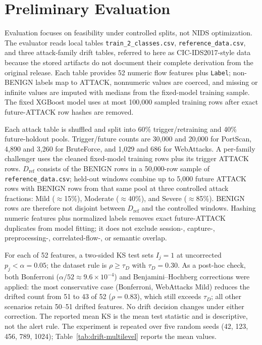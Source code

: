 \documentclass[runningheads]{llncs}
\begin{document}
\FloatBarrier
\section{Preliminary Evaluation}

Evaluation focuses on feasibility under controlled splits, not NIDS optimization. The evaluator reads local tables \texttt{train\_2\_classes.csv}, \texttt{reference\_data.csv}, and three attack-family drift tables, referred to here as CIC-IDS2017-style data because the stored artifacts do not document their complete derivation from the original release. Each table provides 52 numeric flow features plus \texttt{Label}; non-BENIGN labels map to ATTACK, nonnumeric values are coerced, and missing or infinite values are imputed with medians from the fixed-model training sample. The fixed XGBoost model uses at most 100,000 sampled training rows after exact future-ATTACK row hashes are removed.

Each attack table is shuffled and split into 60\% trigger/retraining and 40\% future-holdout pools. Trigger/future counts are 30,000 and 20,000 for PortScan, 4,890 and 3,260 for BruteForce, and 1,029 and 686 for WebAttacks. A per-family challenger uses the cleaned fixed-model training rows plus its trigger ATTACK rows. $D_{\mathrm{ref}}$ consists of the BENIGN rows in a 50,000-row sample of \texttt{reference\_data.csv}; held-out windows combine up to 5,000 future ATTACK rows with BENIGN rows from that same pool at three controlled attack fractions: Mild ($\approx$15\%), Moderate ($\approx$40\%), and Severe ($\approx$85\%). BENIGN rows are therefore not disjoint between $D_{\mathrm{ref}}$ and the controlled windows. Hashing numeric features plus normalized labels removes exact future-ATTACK duplicates from model fitting; it does not exclude session-, capture-, preprocessing-, correlated-flow-, or semantic overlap.

For each of 52 features, a two-sided KS test sets $I_j=1$ at uncorrected $p_j<\alpha=0.05$; the dataset rule is $\rho\geq\tau_D$ with $\tau_D=0.30$. As a post-hoc check, both Bonferroni ($\alpha/52\approx9.6\times10^{-4}$) and Benjamini--Hochberg corrections were applied: the most conservative case (Bonferroni, WebAttacks Mild) reduces the drifted count from 51 to 43 of 52 ($\rho=0.83$), which still exceeds $\tau_D$; all other scenarios retain 50--51 drifted features. No drift decision changes under either correction. The reported mean KS is the mean test statistic and is descriptive, not the alert rule. The experiment is repeated over five random seeds (42, 123, 456, 789, 1024); Table~\ref{tab:drift-multilevel} reports the mean values.
\end{document}
